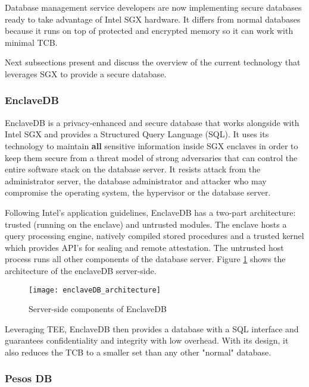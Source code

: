 Database management service developers are now implementing secure databases ready to take advantage of Intel \gls{SGX} hardware. It differs from normal databases because it runs on top of protected and encrypted memory so it can work with minimal \gls{TCB}.

Next subsections present and discuss the overview of the current technology that leverages \gls{SGX} to provide a secure database.

\subsubsection{EnclaveDB}
\label{sssec:enclave_db}

EnclaveDB \cite{enclavedb:1} is a privacy-enhanced and secure database that works alongside with Intel \gls{SGX} and provides a Structured Query Language (SQL). It uses its technology to maintain \textbf{all} sensitive information inside \gls{SGX} enclaves in order to keep them secure from a threat model of strong adversaries that can control the entire software stack on the database server. It resists attack from the administrator server, the database administrator and attacker who may compromise the operating system, the hypervisor or the database server.

Following Intel's application guidelines, EnclaveDB has a two-part architecture: trusted (running on the enclave) and untrusted modules. The enclave hosts a query processing engine, natively compiled stored procedures and a trusted kernel which provides API's for sealing and remote attestation. The untrusted host process runs all other components of the database server. Figure \ref{fig:enclaveDB_architecture} shows the architecture of the enclaveDB server-side.

\begin{figure}[htbp]
	\centering
	{\texttt{[image: enclaveDB\_architecture]}}%
	\caption{Server-side components of EnclaveDB}
	\label{fig:enclaveDB_architecture}
\end{figure}

Leveraging \gls{TEE}, EnclaveDB then provides a database with a \gls{SQL} interface and guarantees confidentiality and integrity with low overhead. With its design, it also reduces the \gls{TCB} to a smaller set than any other "normal" database.

\subsubsection{Pesos DB}
\label{sssec:pesos_db}

